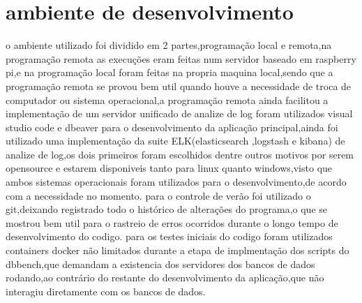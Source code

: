 \documentclass[
	12pt,				%
	openright,			%
	oneside,			%
	a4paper,			%
	english,			%
	french,				%
	spanish,			%
	brazil,				%
	]{abntex2}
\begin{document}
\section{ambiente de desenvolvimento}
\label{sec:ambiente de desenvolvimento}
o ambiente utilizado foi dividido em 2 partes,programação local e remota,na programação remota as execuções eram feitas num servidor baseado em raspberry pi,e na programação local foram feitas na propria maquina local,sendo que a programação remota se provou bem util quando houve a necessidade de troca de computador ou sistema operacional,a programação remota ainda facilitou a implementação de um servidor unificado de analize de log\newline
foram utilizados visual studio code e dbeaver para o desenvolvimento da aplicação principal,ainda foi utilizado uma implementação da suite ELK(elasticsearch ,logstash e kibana) de analize de log,os dois primeiros foram escolhidos dentre outros motivos por serem opensource e estarem disponiveis tanto para linux quanto windows,visto que ambos sistemas operacionais foram utilizados para o desenvolvimento,de acordo com a necessidade no momento.\newline
para o controle de verão foi utilizado o git,deixando registrado todo o histórico de alterações do programa,o que se mostrou bem util para o rastreio de erros ocorridos durante o longo tempo de desenvolvimento do codigo.\newline
para os testes iniciais do codigo foram utilizados containers docker não limitados durante a etapa de implmentação dos scripts do dbbench,que demandam a existencia dos servidores dos bancos de dados rodando,ao contrário do restante do desenvolvimento da aplicação,que não interagiu diretamente com os bancos de dados.\newline
\end{document}
